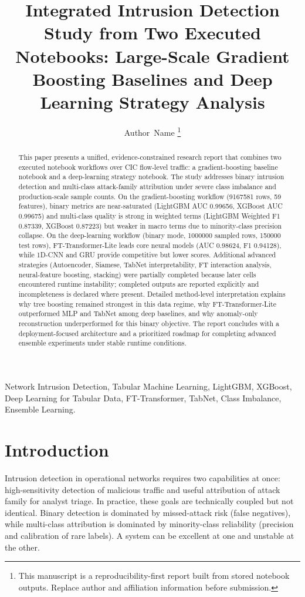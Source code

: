 \documentclass[10pt,journal]{IEEEtran}
\title{Integrated Intrusion Detection Study from Two Executed Notebooks: \newline Large-Scale Gradient Boosting Baselines and Deep Learning Strategy Analysis}
\author{Author~Name
\thanks{This manuscript is a reproducibility-first report built from stored notebook outputs. Replace author and affiliation information before submission.}}
\begin{document}
\maketitle

\begin{abstract}
This paper presents a unified, evidence-constrained research report that combines two executed notebook workflows over CIC flow-level traffic: a gradient-boosting baseline notebook and a deep-learning strategy notebook. The study addresses binary intrusion detection and multi-class attack-family attribution under severe class imbalance and production-scale sample counts. On the gradient-boosting workflow (\num{9167581} rows, 59 features), binary metrics are near-saturated (LightGBM AUC \num{0.99656}, XGBoost AUC \num{0.99675}) and multi-class quality is strong in weighted terms (LightGBM Weighted F1 \num{0.87339}, XGBoost \num{0.87223}) but weaker in macro terms due to minority-class precision collapse. On the deep-learning workflow (binary mode, \num{1000000} sampled rows, \num{150000} test rows), FT-Transformer-Lite leads core neural models (AUC \num{0.98624}, F1 \num{0.94128}), while 1D-CNN and GRU provide competitive but lower scores. Additional advanced strategies (Autoencoder, Siamese, TabNet interpretability, FT interaction analysis, neural-feature boosting, stacking) were partially completed because later cells encountered runtime instability; completed outputs are reported explicitly and incompleteness is declared where present. Detailed method-level interpretation explains why tree boosting remained strongest in this data regime, why FT-Transformer-Lite outperformed MLP and TabNet among deep baselines, and why anomaly-only reconstruction underperformed for this binary objective. The report concludes with a deployment-focused architecture and a prioritized roadmap for completing advanced ensemble experiments under stable runtime conditions.
\end{abstract}

\begin{IEEEkeywords}
Network Intrusion Detection, Tabular Machine Learning, LightGBM, XGBoost, Deep Learning for Tabular Data, FT-Transformer, TabNet, Class Imbalance, Ensemble Learning.
\end{IEEEkeywords}

\section{Introduction}
Intrusion detection in operational networks requires two capabilities at once: high-sensitivity detection of malicious traffic and useful attribution of attack family for analyst triage. In practice, these goals are technically coupled but not identical. Binary detection is dominated by missed-attack risk (false negatives), while multi-class attribution is dominated by minority-class reliability (precision and calibration of rare labels). A system can be excellent at one and unstable at the other.
\end{document}
